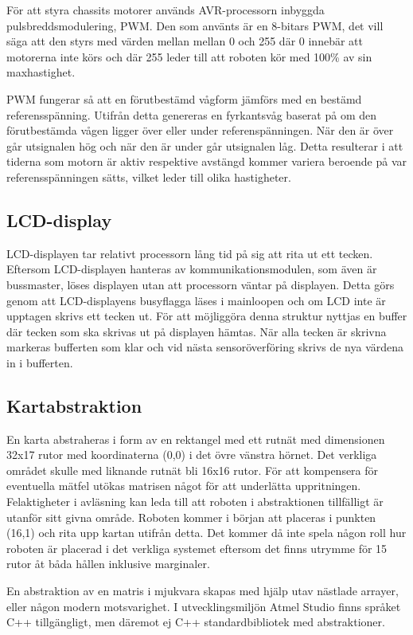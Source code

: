 \documentclass[a4paper,12pt,fleqn]{article}
\begin{document}
För att styra chassits motorer används AVR-processorn inbyggda pulsbreddsmodulering, PWM. Den som använts är en 8-bitars PWM, det vill säga att den styrs med värden mellan mellan 0 och 255 där 0 innebär att motorerna inte körs och där 255 leder till att roboten kör med 100\% av sin maxhastighet.

PWM fungerar så att en förutbestämd vågform jämförs med en bestämd referensspänning. Utifrån detta genereras en fyrkantsvåg baserat på om den förutbestämda vågen ligger över eller under referenspänningen. När den är över går utsignalen hög och när den är under går utsignalen låg. Detta resulterar i att tiderna som motorn är aktiv respektive avstängd kommer variera beroende på var referensspänningen sätts, vilket leder till olika hastigheter.


\subsection{LCD-display}
LCD-displayen tar relativt processorn lång tid på sig att rita ut ett tecken. Eftersom LCD-displayen hanteras av kommunikationsmodulen, som även är bussmaster, löses displayen utan att processorn väntar på displayen. Detta görs genom att LCD-displayens busyflagga läses i mainloopen och om LCD inte är upptagen skrivs ett tecken ut. För att möjliggöra denna struktur nyttjas en buffer där tecken som ska skrivas ut på displayen hämtas. När alla tecken är skrivna markeras bufferten som klar och vid nästa sensoröverföring skrivs de nya värdena in i bufferten. 

\subsection{Kartabstraktion}

En karta abstraheras i form av en rektangel med ett rutnät med dimensionen 32x17 rutor med koordinaterna (0,0) i det övre vänstra hörnet. Det verkliga området skulle med liknande rutnät bli 16x16 rutor. För att kompensera för eventuella mätfel utökas matrisen något för att underlätta uppritningen. Felaktigheter i avläsning kan leda till att roboten i abstraktionen tillfälligt är utanför sitt givna område. Roboten kommer i början att placeras i punkten (16,1) och rita upp kartan utifrån detta. Det kommer då inte spela någon roll hur roboten är placerad i det verkliga systemet eftersom det finns utrymme för 15 rutor åt båda hållen inklusive marginaler. 

En abstraktion av en matris i mjukvara skapas med hjälp utav nästlade arrayer, eller någon modern motsvarighet. I utvecklingsmiljön Atmel Studio finns språket C++ tillgängligt, men däremot ej C++ standardbibliotek med abstraktioner.
\end{document}
